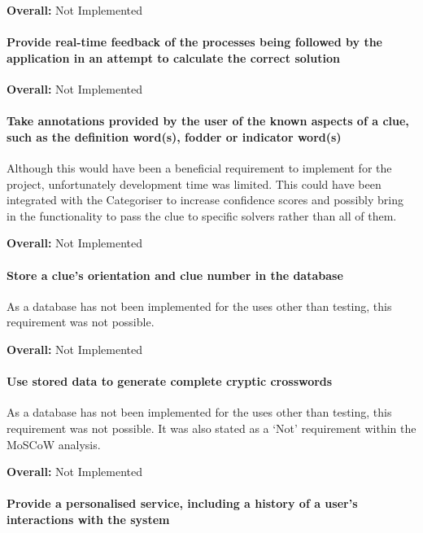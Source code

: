 {\bf Overall:} Not Implemented

\paragraph{Provide real-time feedback of the processes being followed 
by the application in an attempt to calculate the
correct solution}

{\bf Overall:} Not Implemented

\paragraph{Take annotations provided by the user of the known
aspects of a clue, such as the definition word(s), fodder
or indicator word(s)}

Although this would have been a beneficial requirement to implement for the 
project, unfortunately development time was limited. This could have been 
integrated with the Categoriser to increase confidence scores and possibly 
bring in the functionality to pass the clue to specific solvers rather than all of 
them. 

{\bf Overall:} Not Implemented

\paragraph{Store a clue's orientation and clue number in the
database}

As a database has not been implemented for the uses other than testing, 
this requirement was not possible.

{\bf Overall:} Not Implemented

\paragraph{Use stored data to generate complete cryptic crosswords}

As a database has not been implemented for the uses other than testing, 
this requirement was not possible. It was also stated as a `Not' requirement 
within the MoSCoW analysis. 

{\bf Overall:} Not Implemented

\paragraph{Provide a personalised service, including a history of a
user's interactions with the system}


